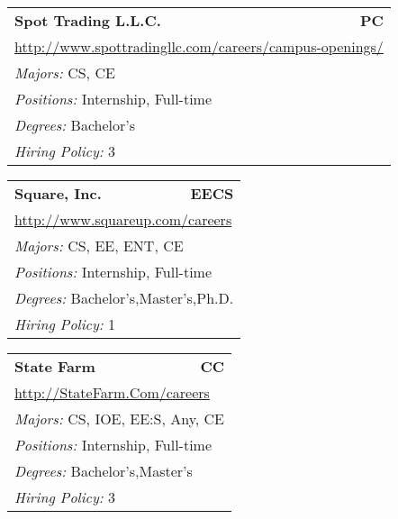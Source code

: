 \documentclass[twoside]{article}
\begin{document}
\begin{center}
\begin{multicols}{3}
\begin{FlushLeft}
\begin{minipage}{.9\columnwidth}
\end{minipage}
 
\begin{minipage}{.9\columnwidth}\begin{tabularx}{.95\columnwidth}{Xr}
                 {\Large\bf Spot Trading L.L.C.} & {\Large\bf PC}\\
    \multicolumn{2}{p{.95\columnwidth}}{\url{http://www.spottradingllc.com/careers/campus-openings/}}\\
    \multicolumn{2}{p{.95\columnwidth}}{\emph{Majors:} CS, CE}\\
    \multicolumn{2}{p{.95\columnwidth}}{\emph{Positions:} Internship, Full-time}\\
    \multicolumn{2}{p{.95\columnwidth}}{\emph{Degrees:} Bachelor's}\\
    \multicolumn{2}{p{.95\columnwidth}}{\emph{Hiring Policy:} 3}\\
    \end{tabularx}
    
\end{minipage}
 
\begin{minipage}{.9\columnwidth}\begin{tabularx}{.95\columnwidth}{Xr}
                 {\Large\bf Square, Inc.} & {\Large\bf EECS}\\
    \multicolumn{2}{p{.95\columnwidth}}{\url{http://www.squareup.com/careers}}\\
    \multicolumn{2}{p{.95\columnwidth}}{\emph{Majors:} CS, EE, ENT, CE}\\
    \multicolumn{2}{p{.95\columnwidth}}{\emph{Positions:} Internship, Full-time}\\
    \multicolumn{2}{p{.95\columnwidth}}{\emph{Degrees:} Bachelor's,Master's,Ph.D.}\\
    \multicolumn{2}{p{.95\columnwidth}}{\emph{Hiring Policy:} 1}\\
    \end{tabularx}
    
\end{minipage}
 
\begin{minipage}{.9\columnwidth}\begin{tabularx}{.95\columnwidth}{Xr}
                 {\Large\bf State Farm} & {\Large\bf CC}\\
    \multicolumn{2}{p{.95\columnwidth}}{\url{http://StateFarm.Com/careers}}\\
    \multicolumn{2}{p{.95\columnwidth}}{\emph{Majors:} CS, IOE, EE:S, Any, CE}\\
    \multicolumn{2}{p{.95\columnwidth}}{\emph{Positions:} Internship, Full-time}\\
    \multicolumn{2}{p{.95\columnwidth}}{\emph{Degrees:} Bachelor's,Master's}\\
    \multicolumn{2}{p{.95\columnwidth}}{\emph{Hiring Policy:} 3}\\
    \end{tabularx}
    

\end{minipage}
\end{FlushLeft}
\end{multicols}
\end{center}
\end{document}
